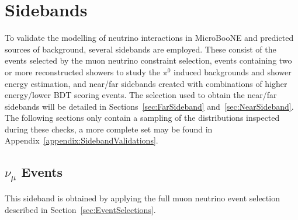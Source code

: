 \newpage
\section{Sidebands}
\label{sec:sidebands}


To validate the modelling of neutrino interactions in MicroBooNE and predicted sources of background, several sidebands are employed. These consist of the events selected by the muon neutrino constraint selection, events containing two or more reconstructed showers to study the $\pi^0$ induced backgrounds and shower energy estimation, and near/far sidebands created with combinations of higher energy/lower BDT scoring events. The selection used to obtain the near/far sidebands will be detailed in Sections~\ref{sec:FarSideband} and~\ref{sec:NearSideband}. The following sections only contain a sampling of the distributions inspected during these checks, a more complete set may be found in Appendix~\ref{appendix:SidebandValidations}.

\subsection{$\nu_{\mu}$ Events}
\label{sec:NuMuSideband}

This sideband is obtained by applying the full muon neutrino event selection described in Section~\ref{sec:EventSelections}.

